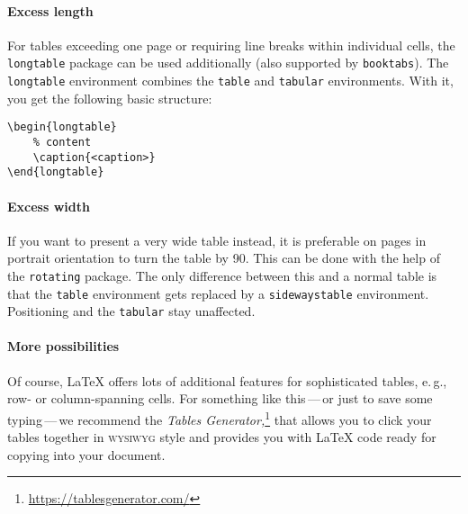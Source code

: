 \paragraph{Excess length}
For tables exceeding one page or requiring line breaks within individual cells,
the \texttt{longtable} package can be used additionally (also supported by \texttt{booktabs}).
The \texttt{longtable} environment combines the \texttt{table} and \texttt{tabular} environments.
With it, you get the following basic structure:

\begin{verbatim}
\begin{longtable}
    % content
    \caption{<caption>}
\end{longtable}
\end{verbatim}

\paragraph{Excess width}
If you want to present a very wide table instead, it is preferable on pages in portrait orientation to turn the table by 90\textdegree{}.
This can be done with the help of the \texttt{rotating} package.
The only difference between this and a normal table is that the \texttt{table} environment gets replaced by a \texttt{sidewaystable} environment.
Positioning and the \texttt{tabular} stay unaffected.

\paragraph{More possibilities}
Of course, \LaTeX{} offers lots of additional features for sophisticated tables, e.\,g., row- or column-spanning cells.
For something like this\,---\,or just to save some typing\,---\,we recommend the \emph{Tables Generator}\textit{,}\footnote{\url{https://tablesgenerator.com/}} that allows you to click your tables together in \textsc{wysiwyg} style and provides you with \LaTeX{} code ready for copying into your document.


